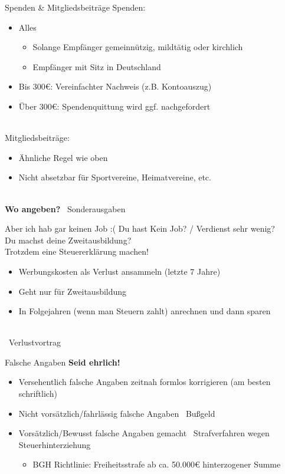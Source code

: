 \documentclass[draft]{beamer}
\newcommand{\n}{\hfill\\\vspace{0.25cm}}
\begin{document}
			\begin{frame}{Spenden \& Mitgliedsbeiträge}
				Spenden:
				\begin{itemize}
					\item Alles
					\begin{itemize}
						\item Solange Empfänger gemeinnützig, mildtätig oder kirchlich
						\item Empfänger mit Sitz in Deutschland
					\end{itemize}
					\item Bis 300€: Vereinfachter Nachweis (z.B. Kontoauszug)
					\item Über 300€: Spendenquittung wird ggf. nachgefordert
				\end{itemize}\n\pause
				Mitgliedsbeiträge:
				\begin{itemize}
					\item Ähnliche Regel wie oben
					\item Nicht absetzbar für Sportvereine, Heimatvereine, etc.
				\end{itemize}\n\pause
				\textbf{Wo angeben?} \textrightarrow\ Sonderausgaben
			\end{frame}
		
			\begin{frame}{Aber ich hab gar keinen Job :(}
				Du hast Kein Job? / Verdienst sehr wenig?\\\pause
				Du machst deine Zweitausbildung?\\\pause
				Trotzdem eine Steuererklärung machen!\n\pause
				\begin{itemize}
					\item Werbungskosten als Verlust ansammeln (letzte 7 Jahre)
					\item Geht nur für Zweitausbildung
					\item In Folgejahren (wenn man Steuern zahlt) anrechnen und dann sparen
				\end{itemize}\n
				\textrightarrow\ Verlustvortrag
			\end{frame}
		
			\begin{frame}{Falsche Angaben}
				\textbf{Seid ehrlich!}\n
				\begin{itemize}
					\item Versehentlich falsche Angaben zeitnah formlos korrigieren (am besten schriftlich)
					\item Nicht vorsätzlich/fahrlässig falsche Angaben \textrightarrow\ Bußgeld
					\item Vorsätzlich/Bewusst falsche Angaben gemacht \textrightarrow\ Strafverfahren wegen Steuerhinterziehung
					\begin{itemize}
						\item BGH Richtlinie: Freiheitsstrafe ab ca. 50.000€ hinterzogener Summe
					\end{itemize}
				\end{itemize}
			\end{frame}
		
\end{document}
